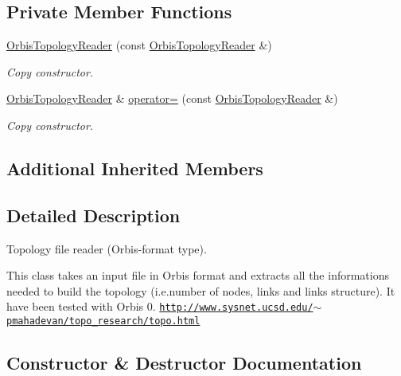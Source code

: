 \subsection*{Private Member Functions}
\begin{DoxyCompactItemize}
\item 
\hyperlink{classns3_1_1OrbisTopologyReader_a1d382901a7cada25e29aeeac605ba829}{Orbis\+Topology\+Reader} (const \hyperlink{classns3_1_1OrbisTopologyReader}{Orbis\+Topology\+Reader} \&)
\begin{DoxyCompactList}\small\item\em Copy constructor. \end{DoxyCompactList}\item 
\hyperlink{classns3_1_1OrbisTopologyReader}{Orbis\+Topology\+Reader} \& \hyperlink{classns3_1_1OrbisTopologyReader_a98887e94c257cc135a904529023e2e2c}{operator=} (const \hyperlink{classns3_1_1OrbisTopologyReader}{Orbis\+Topology\+Reader} \&)
\begin{DoxyCompactList}\small\item\em Copy constructor. \end{DoxyCompactList}\end{DoxyCompactItemize}
\subsection*{Additional Inherited Members}


\subsection{Detailed Description}
Topology file reader (Orbis-\/format type). 

This class takes an input file in Orbis format and extracts all the informations needed to build the topology (i.\+e.\+number of nodes, links and links structure). It have been tested with Orbis 0. \href{http://www.sysnet.ucsd.edu/~pmahadevan/topo_research/topo.html}{\tt http\+://www.\+sysnet.\+ucsd.\+edu/$\sim$pmahadevan/topo\+\_\+research/topo.\+html} 

\subsection{Constructor \& Destructor Documentation}
